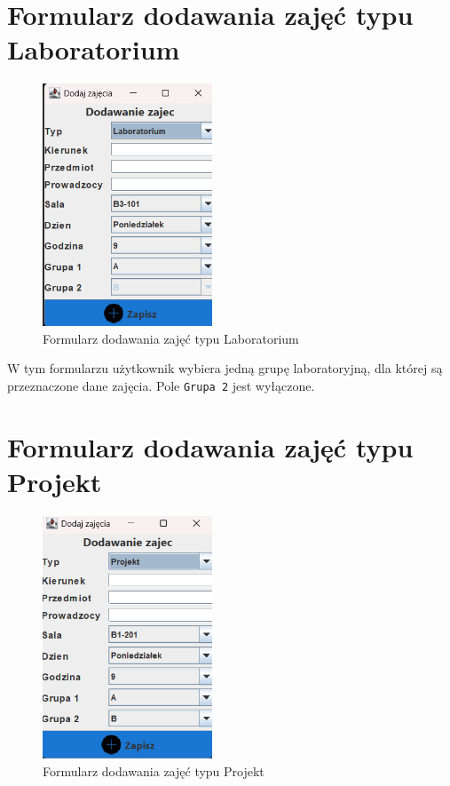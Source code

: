 \section*{Formularz dodawania zajęć typu Laboratorium}
\begin{figure}[H]
\centering
\includegraphics[width=0.45\textwidth]{figures/workApl/add_lab_panel.png}
\caption{Formularz dodawania zajęć typu Laboratorium}
\label{fig:add_lab}
\end{figure}

W tym formularzu użytkownik wybiera jedną grupę laboratoryjną, dla której są przeznaczone dane zajęcia. Pole \texttt{Grupa 2} jest wyłączone.

\section*{Formularz dodawania zajęć typu Projekt}
\begin{figure}[H]
\centering
\includegraphics[width=0.45\textwidth]{figures/workApl/add_projekt_panel.png}
\caption{Formularz dodawania zajęć typu Projekt}
\label{fig:add_projekt}
\end{figure}

